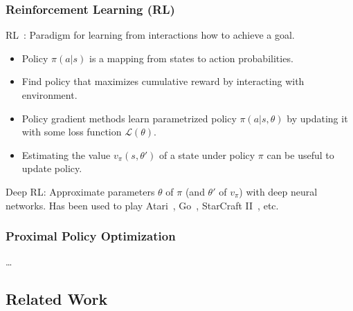 \begin{frame}
    \frametitle{Reinforcement Learning (RL)}

    RL~\cite{sutton_reinforcement_2018}: Paradigm for learning from interactions how to achieve a goal.

    \begin{itemize}
        \item Policy \(\pi(a|s)\) is a mapping from states to action probabilities.
        \item Find policy that maximizes cumulative reward by interacting with environment.
        \item Policy gradient methods learn parametrized policy \(\pi(a|s,\theta)\) by updating it with some loss function \(\mathcal{L(\theta)}\).
        \item Estimating the value \(v_\pi(s,\theta')\) of a state under policy \(\pi\) can be useful to update policy.
    \end{itemize}

    Deep RL: Approximate parameters \(\theta\) of \(\pi\) (and \(\theta'\) of \(v_\pi\)) with deep neural networks.
    Has been used to play Atari~\cite{mnih_human-level_2015}, Go~\cite{silver_mastering_2016}, StarCraft II~\cite{vinyals_grandmaster_2019}, etc.
\end{frame}

\begin{frame}
    \frametitle{Proximal Policy Optimization}

    \dots
\end{frame}

\subsection{Related Work}

